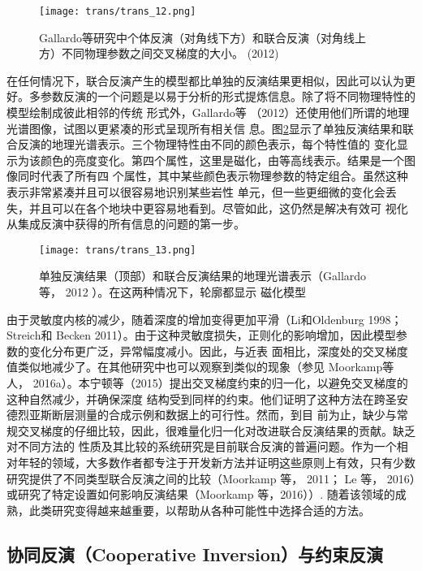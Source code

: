 \begin{figure}[H]
    \centering
    \texttt{[image: trans/trans\_12.png]}
    \caption{Gallardo等研究中个体反演（对角线下方）和联合反演（对角线上方）不同物理参数之间交叉梯度的大小。 (2012)}\label{trans12}
    \setcounter{figure}{2}
\end{figure}


在任何情况下，联合反演产生的模型都比单独的反演结果更相似，因此可以认为更好。多参数反演的一个问题是以易于分析的形式提炼信息。除了将不同物理特性的模型绘制成彼此相邻的传统 形式外，Gallardo等 （2012）还使用他们所谓的地理光谱图像，试图以更紧凑的形式呈现所有相关信 息。图\ref{trans13}显示了单独反演结果和联合反演的地理光谱表示。三个物理特性由不同的颜色表示，每个特性值的 变化显示为该颜色的亮度变化。第四个属性，这里是磁化，由等高线表示。结果是一个图像同时代表了所有四 个属性，其中某些颜色表示物理参数的特定组合。虽然这种表示非常紧凑并且可以很容易地识别某些岩性 单元，但一些更细微的变化会丢失，并且可以在各个地块中更容易地看到。尽管如此，这仍然是解决有效可 视化从集成反演中获得的所有信息的问题的第一步。

\begin{figure}[H]
    \centering
    \texttt{[image: trans/trans\_13.png]}
    \setcounter{figure}{5}
    \caption{单独反演结果（顶部）和联合反演结果的地理光谱表示（Gallardo 等， 2012 ）。在这两种情况下，轮廓都显示 磁化模型}\label{trans13}
    
\end{figure}

由于灵敏度内核的减少，随着深度的增加变得更加平滑（Li和Oldenburg 1998；Streich和 Becken 2011）。由于这种灵敏度损失，正则化的影响增加，因此模型参数的变化分布更广泛，异常幅度减小。因此，与近表 面相比，深度处的交叉梯度值类似地减少了。在其他研究中也可以观察到类似的现象（参见 Moorkamp等 人， 2016a）。本宁顿等（2015）提出交叉梯度约束的归一化，以避免交叉梯度的这种自然减少，并确保深度 结构受到同样的约束。他们证明了这种方法在跨圣安德烈亚斯断层测量的合成示例和数据上的可行性。然而，到目 前为止，缺少与常规交叉梯度的仔细比较，因此，很难量化归一化对改进联合反演结果的贡献。缺乏对不同方法的 性质及其比较的系统研究是目前联合反演的普遍问题。作为一个相对年轻的领域，大多数作者都专注于开发新方法并证明这些原则上有效，只有少数研究提供了不同类型联合反演之间的比较（Moorkamp 等， 2011； Le 等， 2016）或研究了特定设置如何影响反演结果（Moorkamp 等，2016））. 随着该领域的成熟，此类研究变得越来越重要，以帮助从各种可能性中选择合适的方法。

\subsection{协同反演（Cooperative Inversion）与约束反演}

